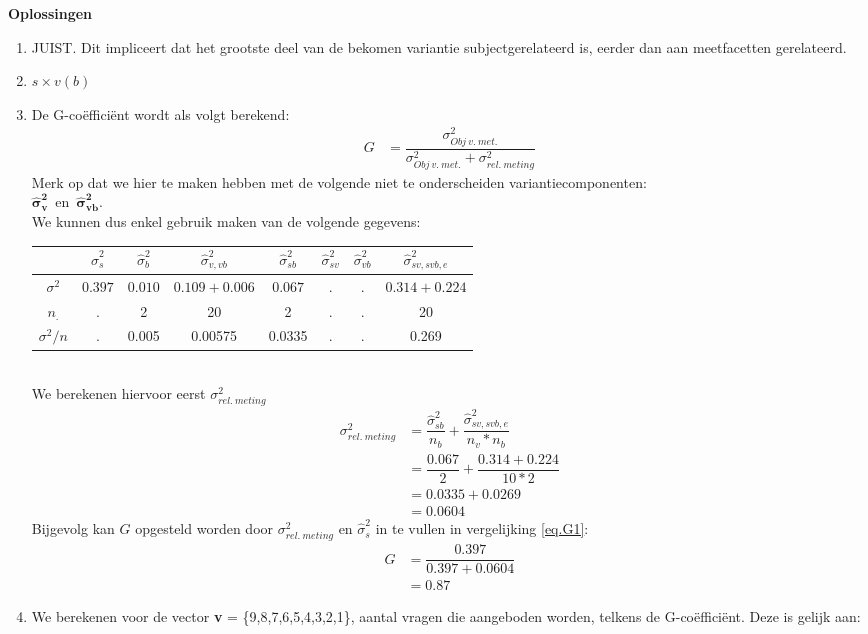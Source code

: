 \OPLOSSING
{
\textbf{Oplossingen}
\begin{enumerate}
\item JUIST. Dit impliceert dat het grootste deel van de bekomen variantie subjectgerelateerd is, eerder dan aan meetfacetten gerelateerd.
\item $s \times v(b)$
\begin{center}

\end{center}
\newpage
\item De G-co\"{e}ffici\"{e}nt wordt als volgt berekend:\\
	\begin{align}
		G &=\dfrac{\sigma^2_{Obj~v.~met.}}{\sigma^2_{Obj~v.~met.}+ \sigma^2_{rel.~meting}} \label{eq.G1}
	\end{align}
	Merk op dat we hier te maken hebben met de volgende niet te onderscheiden variantiecomponenten:~ \\
	$ \bm{\hat{\sigma}^2_{v}} $~en~$\bm{\hat{\sigma}^2_{vb} }$.\\
	We kunnen dus enkel gebruik maken van de volgende gegevens: \\
	\begin{tabular}{|c|c|c|c|c|c|c|c|} \hline
	 & $ \hat{\sigma}^2_{s}$ & $ \hat{\sigma}^2_{b} $& $ \hat{\sigma}^2_{v,vb} $ & $ \hat{\sigma}^2_{sb}$ & $\hat{\sigma}^2_{sv} $ & $ \hat{\sigma}^2_{vb} $& $ \hat{\sigma}^2_{sv, svb, e} $ \\ \hline
	$\sigma^2 $  			& $ 0.397 $ 			& $ 0.010 $ 			& $0.109+0.006  $ 			& $ 0.067 $				 & $. $	& $ . $& $ 0.314 + 0.224  $ \\
	$n_.$				& .						& 2					& 20				 		& 2			  		 & $. $	& $ . $&  20 \\ \hline
	$\sigma^2 / n$ 		& .						& 0.005				& 0.00575				 		& 0.0335			  	 & $. $	& $ . $&  0.269 \\ \hline
	\end{tabular} \\

  We berekenen hiervoor eerst $\sigma^2_{rel.~meting}$
  \begin{align*}
    \sigma^2_{rel.~meting} 	&=  \dfrac{\hat{\sigma}^2_{sb}}{n_b} + \dfrac{\hat{\sigma}^2_{sv,svb,e}}{n_v*n_b} \\
                &=  \dfrac{{0.067}}{2} + \dfrac{{0.314 + 0.224}}{10*2}\\
                &= 0.0335 + 0.0269 \\
                &= 0.0604
  \end{align*}
  Bijgevolg kan $G$ opgesteld worden door $\sigma^2_{rel.~meting}$ en $\hat{\sigma}^2_{s}$ in te vullen in vergelijking \ref{eq.G1}:
  \begin{align*}
    G 	&=\dfrac{0.397}{0.397 + 0.0604}\\
      &=0.87
  \end{align*}
\item We berekenen voor de vector \textbf{v} = \{9,8,7,6,5,4,3,2,1\}, aantal vragen die aangeboden worden, telkens de G-co\"{e}ffici\"{e}nt. Deze is gelijk aan:


\end{enumerate}}
